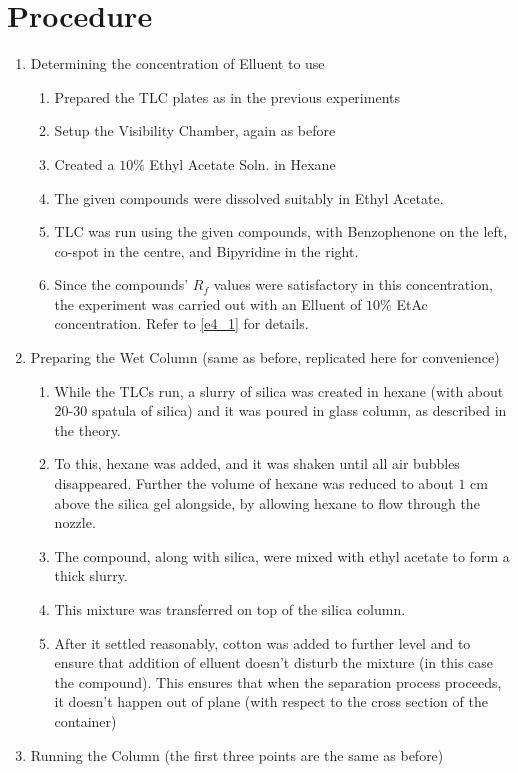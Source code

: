 \section{Procedure}	
	\begin{enumerate}
		\item Determining the concentration of Elluent to use
		\begin{enumerate}
			\item Prepared the TLC plates as in the previous experiments
			\item Setup the Visibility Chamber, again as before
			\item Created a $10\%$ Ethyl Acetate Soln. in Hexane
			\item The given compounds were dissolved suitably in Ethyl Acetate.
			\item TLC was run using the given compounds, with Benzophenone on the left, co-spot in the centre, and Bipyridine in the right.
			\item Since the compounds' $R_f$ values were satisfactory in this concentration, the experiment was carried out with an Elluent of $10\%$ EtAc concentration. Refer to \autoref{e4_1} for details.
		\end{enumerate}
		\item Preparing the Wet Column (same as before, replicated here for convenience)
		\begin{enumerate}
			\item While the TLCs run, a slurry of silica was created in hexane (with about 20-30 spatula of silica) and it was poured in glass column, as described in the theory.
			\item To this, hexane was added, and it was shaken until all air bubbles disappeared. Further the volume of hexane was reduced to about $1$ cm above the silica gel alongside, by allowing hexane to flow through the nozzle.
			\item The compound, along with silica, were mixed with ethyl acetate to form a thick slurry.
			\item This mixture was transferred on top of the silica column.
			\item After it settled reasonably, cotton was added to further level and to ensure that addition of elluent doesn't disturb the mixture (in this case the compound). This ensures that when the separation process proceeds, it doesn't happen out of plane (with respect to the cross section of the container)
		\end{enumerate}
		\item Running the Column (the first three points are the same as before)

\end{enumerate}
